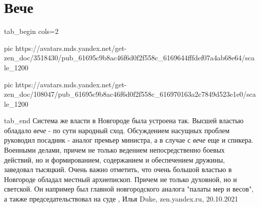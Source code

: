  
 
 
 
 
\chapter{Вече}
\label{sec:slova.veche}


\ifcmt
  tab_begin cols=2

     pic https://avatars.mds.yandex.net/get-zen_doc/3518430/pub_61695c9b8ac46f6d0f2f558c_6169644fffdef07a4ab68e64/scale_1200

     pic https://avatars.mds.yandex.net/get-zen_doc/108047/pub_61695c9b8ac46f6d0f2f558c_616970163a2c7849d523e1e0/scale_1200

  tab_end
\fi
Система же власти в Новгороде была устроена так. Высшей властью обладало \emph{вече} -
по сути народный сход. Обсуждением насущных проблем руководил посадник - аналог
премьер министра, а в случае с \emph{вече} еще и спикера. Военными делами, причем не
только ведением непосредственно боевых действий, но и формированием,
содержанием и обеспечением дружины, заведовал тысяцкий. Очень важно отметить,
что очень большой властью в Новгороде обладал местный архиепископ. Причем не
только духовной, но и светской. Он например был главной новгородского аналога
"палаты мер и весов", а также председательствовал на суде
, Илья Duke, zen.yandex.ru, 20.10.2021

